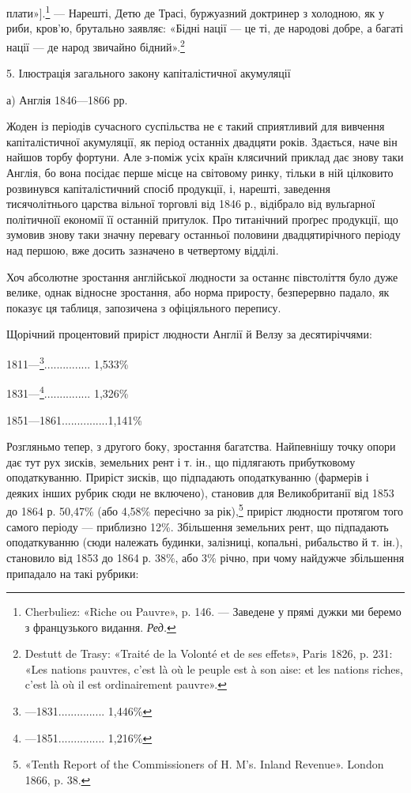\parcont{}  %
плати»].\footnote*{
Cherbuliez: «Riche ou Pauvre», p. 146. — Заведене у прямі дужки
ми беремо з французького видання. \emph{Ред.}
} — Нарешті, Детю де Трасі, буржуазний доктринер з
холодною, як у риби, кров’ю, брутально заявляє: «Бідні нації —
це ті, де народові добре, а багаті нації — де народ звичайно бідний».\footnote{
Destutt de Trasy: «Traité de la Volonté et de ses effets», Paris
1826, p. 231: «Les nations pauvres, c’est là où le peuple est à son aise: et
les nations riches, c’est là où il est ordinairement pauvre».
}

5. Ілюстрація загального закону капіталістичної акумуляції

а) Англія 1846—1866 рр.

Жоден із періодів сучасного суспільства не є такий сприятливий
для вивчення капіталістичної акумуляції, як період останніх
двадцяти років. Здається, наче він найшов торбу фортуни.
Але з-поміж усіх країн клясичний приклад дає знову таки
Англія, бо вона посідає перше місце на світовому ринку,
тільки в ній цілковито розвинувся капіталістичний спосіб продукції,
і, нарешті, заведення тисячолітнього царства вільної
торговлі від 1846 р., відібрало від вульґарної політичноїї економії
її останній притулок. Про титанічний проґрес продукції, що зумовив
знову таки значну перевагу останньої половини двадцятирічного
періоду над першою, вже досить зазначено в четвертому
відділі.

Хоч абсолютне зростання англійської людности за останнє півстоліття
було дуже велике, однак відносне зростання, або норма
приросту, безперервно падало, як показує ця таблиця, запозичена
з офіціяльного перепису.

Щорічний процентовий приріст людности Англії й Велзу
за десятиріччями:

1811—\footnote{
—1831............... 1,446\%
}............... 1,533\%

1831—\footnote{
—1851............... 1,216\%
}...............  1,326\%

1851—1861...............1,141\%

Розгляньмо тепер, з другого боку, зростання багатства. Найпевнішу
точку опори дає тут рух зисків, земельних рент і т. ін.,
що підлягають прибутковому оподаткуванню. Приріст зисків, що
підпадають оподаткуванню (фармерів і деяких інших рубрик сюди
не включено), становив для Великобританії від 1853 до 1864 р.
50,47\% (або 4,58\% пересічно за рік),\footnote{
«Tenth Report of the Commissioners of H. M’s. Inland Revenue».
London 1866, p. 38.
} приріст людности протягом
того самого періоду — приблизно 12\%. Збільшення земельних
рент, що підпадають оподаткуванню (сюди належать
будинки, залізниці, копальні, рибальство й т. ін.), становило
від 1853 до 1864 р. 38\%, або 3\% річно, при чому найдужче
збільшення припадало на такі рубрики:
